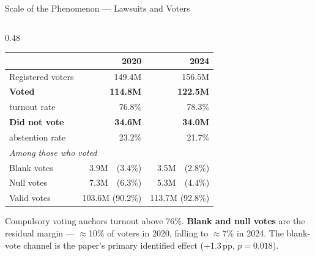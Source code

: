 \documentclass[aspectratio=169,10pt]{beamer}
\begin{document}
\begin{frame}{Scale of the Phenomenon --- Lawsuits and Voters}
\begin{columns}[T]
\begin{column}{0.48\textwidth}
\footnotesize
\renewcommand{\arraystretch}{1.1}
\begin{tabular}{lrr}
  \toprule
  & 2020 & 2024 \\
  \midrule
  Registered voters       & 149.4M & 156.5M \\
  \textbf{Voted}          & \textbf{114.8M} & \textbf{122.5M} \\
  \quad turnout rate      & 76.8\% & 78.3\% \\
  \textbf{Did not vote}   & \textbf{34.6M} & \textbf{34.0M} \\
  \quad abstention rate   & 23.2\% & 21.7\% \\
  \multicolumn{3}{l}{\textit{Among those who voted}} \\
  Blank votes             & 3.9M\ \ (3.4\%) & 3.5M\ \ (2.8\%) \\
  Null votes              & 7.3M\ \ (6.3\%) & 5.3M\ \ (4.4\%) \\
  Valid votes             & 103.6M (90.2\%) & 113.7M (92.8\%) \\
  \bottomrule
\end{tabular}

\vspace{4pt}
\begin{block}{}
  \footnotesize
  Compulsory voting anchors turnout above 76\%. \textbf{Blank and null votes} are the residual margin --- $\approx$10\% of voters in 2020, falling to $\approx$7\% in 2024. The blank-vote channel is the paper's primary identified effect ($+$1.3\,pp, $p=0.018$).
\end{block}
\end{column}

\end{columns}
\end{frame}
\end{document}
